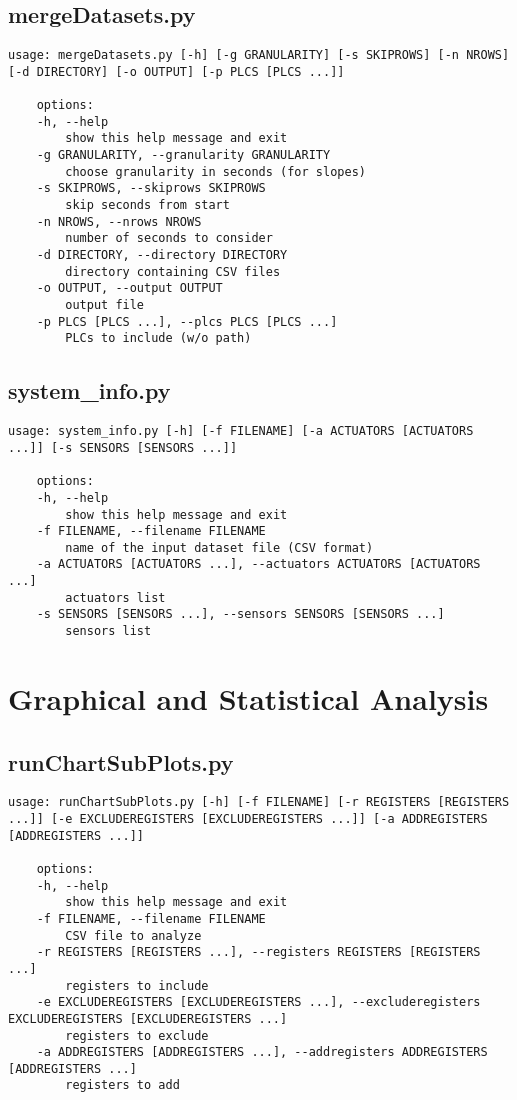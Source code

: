 \subsection*{mergeDatasets.py}
\begin{lstlisting}[numbers=none]
	usage: mergeDatasets.py [-h] [-g GRANULARITY] [-s SKIPROWS] [-n NROWS] [-d DIRECTORY] [-o OUTPUT] [-p PLCS [PLCS ...]]

	options:
	-h, --help	
		show this help message and exit
	-g GRANULARITY, --granularity GRANULARITY	
		choose granularity in seconds (for slopes)
	-s SKIPROWS, --skiprows SKIPROWS	
		skip seconds from start
	-n NROWS, --nrows NROWS		
		number of seconds to consider
	-d DIRECTORY, --directory DIRECTORY		
		directory containing CSV files
	-o OUTPUT, --output OUTPUT		
		output file
	-p PLCS [PLCS ...], --plcs PLCS [PLCS ...]	
		PLCs to include (w/o path)
\end{lstlisting}

\subsection*{system\_info.py}
\begin{lstlisting}[numbers=none]
	usage: system_info.py [-h] [-f FILENAME] [-a ACTUATORS [ACTUATORS ...]] [-s SENSORS [SENSORS ...]]
	
	options:
	-h, --help            
		show this help message and exit
	-f FILENAME, --filename FILENAME
		name of the input dataset file (CSV format)
	-a ACTUATORS [ACTUATORS ...], --actuators ACTUATORS [ACTUATORS ...]
		actuators list
	-s SENSORS [SENSORS ...], --sensors SENSORS [SENSORS ...]
		sensors list
\end{lstlisting}

\section*{Graphical and Statistical Analysis}
\subsection*{runChartSubPlots.py}
\begin{lstlisting}[numbers=none]
	usage: runChartSubPlots.py [-h] [-f FILENAME] [-r REGISTERS [REGISTERS ...]] [-e EXCLUDEREGISTERS [EXCLUDEREGISTERS ...]] [-a ADDREGISTERS [ADDREGISTERS ...]]
	
	options:
	-h, --help            
		show this help message and exit
	-f FILENAME, --filename FILENAME
		CSV file to analyze
	-r REGISTERS [REGISTERS ...], --registers REGISTERS [REGISTERS ...]
		registers to include
	-e EXCLUDEREGISTERS [EXCLUDEREGISTERS ...], --excluderegisters EXCLUDEREGISTERS [EXCLUDEREGISTERS ...]
		registers to exclude
	-a ADDREGISTERS [ADDREGISTERS ...], --addregisters ADDREGISTERS [ADDREGISTERS ...]
		registers to add
\end{lstlisting}

